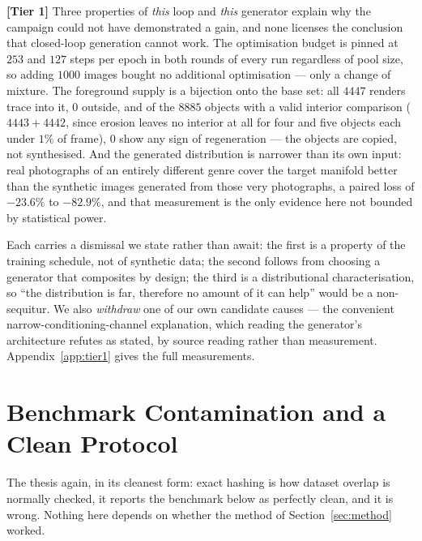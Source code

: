 \documentclass{article} %
\begin{document}
\textbf{[Tier 1]} Three properties of \emph{this} loop and \emph{this} generator explain why the
campaign could not have demonstrated a gain, and none licenses the conclusion that closed-loop
generation cannot work. The optimisation budget is pinned at $253$ and $127$ steps per epoch in both
rounds of every run regardless of pool size, so adding $1000$ images bought no additional optimisation
--- only a change of mixture. The foreground supply is a bijection onto the base set: all $4447$
renders trace into it, $0$ outside, and of the $8885$ objects with a valid interior comparison
($4443+4442$, since erosion leaves no interior at all for four and five objects each under $1\%$ of
frame), $0$ show any sign of regeneration --- the objects are copied, not synthesised. And the
generated distribution is narrower than its own input: real photographs of an entirely different genre
cover the target manifold better than the synthetic images generated from those very photographs, a
paired loss of $-23.6\%$ to $-82.9\%$, and that measurement is the only evidence here not bounded by
statistical power.

Each carries a dismissal we state rather than await: the first is a property of the training schedule,
not of synthetic data; the second follows from choosing a generator that composites by design; the
third is a distributional characterisation, so ``the distribution is far, therefore no amount of it
can help'' would be a non-sequitur. We also \emph{withdraw} one of our own candidate causes --- the
convenient narrow-conditioning-channel explanation, which reading the generator's architecture refutes
as stated, by source reading rather than measurement. Appendix~\ref{app:tier1} gives the full
measurements.

\section{Benchmark Contamination and a Clean Protocol}
\label{sec:contamination}

The thesis again, in its cleanest form: exact hashing is how dataset overlap is normally checked, it
reports the benchmark below as perfectly clean, and it is wrong. Nothing here depends on whether the
method of Section~\ref{sec:method} worked.
\end{document}
